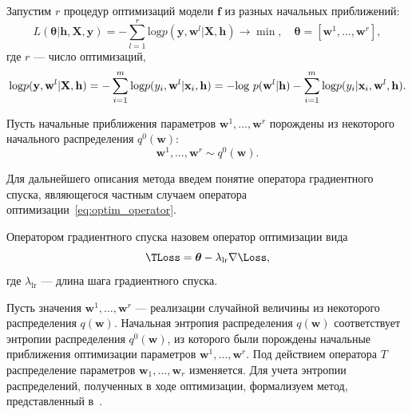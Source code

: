 Запустим $r$ процедур оптимизаций модели $\mathbf{f}$ из разных начальных приближений:
\[
	L( \boldsymbol{\theta}| \mathbf{h}, \mathbf{X}, \mathbf{y}) = -\sum_{l=1}^r \text{log}p(\mathbf{y}, \mathbf{w}^l|\mathbf{X}, \mathbf{h})  \to \min, \quad \boldsymbol{\theta} = [\mathbf{w}^1, \dots, \mathbf{w}^r],
\] 
где $r$ --- число оптимизаций,
\begin{equation}
\label{eq:loss_func}
\text{log}p(\mathbf{y}, \mathbf{w}^l|\mathbf{X}, \mathbf{h}) = -\sum_{i=1}^m \textnormal{log}p({y}_i, \mathbf{w}^l |\mathbf{x}_i, \mathbf{h}) = -\textnormal{log}~p(\mathbf{w}^l|\mathbf{h}) - \sum_{i=1}^m \textnormal{log}p({y}_i |\mathbf{x}_i, \mathbf{w}^l, \mathbf{h}).
\end{equation}

Пусть начальные приближения параметров $\mathbf{w}^1, \dots, \mathbf{w}^r$ порождены из некоторого начального распределения $q^0(\mathbf{w})$:
\[ 
	\mathbf{w}^1, \dots, \mathbf{w}^r \sim q^0(\mathbf{w}). 
\]




Для дальнейшего описания метода введем понятие оператора градиентного спуска, являющегося частным случаем оператора оптимизации~\eqref{eq:optim_operator}.
\begin{defin}
Оператором градиентного спуска назовем оператор оптимизации вида
\begin{equation}
\label{eq:sgd}
	\TLoss  = \boldsymbol{\theta} - \lambda_{\text{lr}} \nabla \Loss, 
\end{equation}
где  $\lambda_{\text{lr}}$ --- длина шага градиентного спуска.
\end{defin}

Пусть значения $\mathbf{w}^1, \dots, \mathbf{w}^r$  --- реализации случайной величины из некоторого распределения $q(\mathbf{w})$. Начальная энтропия распределения $q(\mathbf{w})$ соответствует энтропии распределения $q^0(\mathbf{w})$, из которого были порождены начальные приближения оптимизации параметров $\mathbf{w}^1, \dots, \mathbf{w}^r$. Под действием оператора $T$ распределение параметров $\mathbf{w}_1, \dots, \mathbf{w}_r$ изменяется. Для учета энтропии распределений, полученных в ходе оптимизации,
{ формализуем метод,  представленный в~\cite{early}. }

